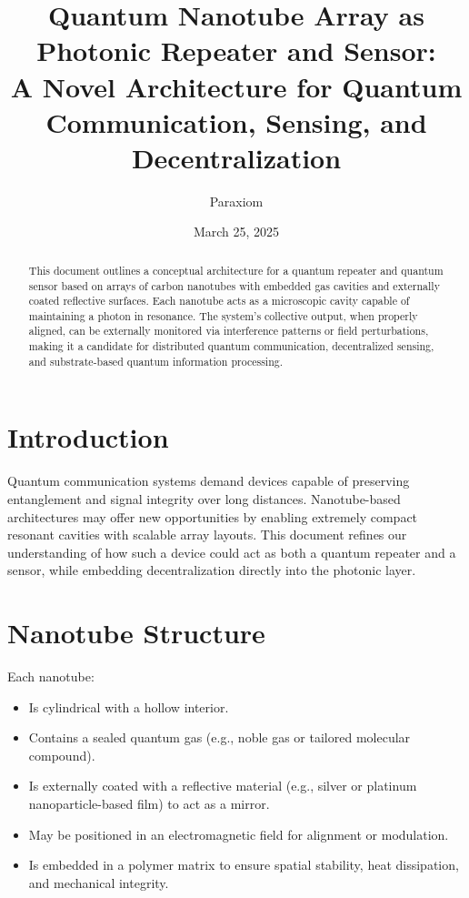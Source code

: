 \documentclass[11pt]{article}
\title{Quantum Nanotube Array as Photonic Repeater and Sensor:\\A Novel Architecture for Quantum Communication, Sensing, and Decentralization}
\author{Paraxiom}
\date{March 25, 2025}
\begin{document}
	
	\maketitle
	
	\begin{abstract}
		This document outlines a conceptual architecture for a quantum repeater and quantum sensor based on arrays of carbon nanotubes with embedded gas cavities and externally coated reflective surfaces. Each nanotube acts as a microscopic cavity capable of maintaining a photon in resonance. The system's collective output, when properly aligned, can be externally monitored via interference patterns or field perturbations, making it a candidate for distributed quantum communication, decentralized sensing, and substrate-based quantum information processing.
	\end{abstract}
	
	\section{Introduction}
	Quantum communication systems demand devices capable of preserving entanglement and signal integrity over long distances. Nanotube-based architectures may offer new opportunities by enabling extremely compact resonant cavities with scalable array layouts. This document refines our understanding of how such a device could act as both a quantum repeater and a sensor, while embedding decentralization directly into the photonic layer.
	
	\section{Nanotube Structure}
	Each nanotube:
	\begin{itemize}
		\item Is cylindrical with a hollow interior.
		\item Contains a sealed quantum gas (e.g., noble gas or tailored molecular compound).
		\item Is externally coated with a reflective material (e.g., silver or platinum nanoparticle-based film) to act as a mirror.
		\item May be positioned in an electromagnetic field for alignment or modulation.
		\item Is embedded in a polymer matrix to ensure spatial stability, heat dissipation, and mechanical integrity.
	\end{itemize}
	
\end{document}

